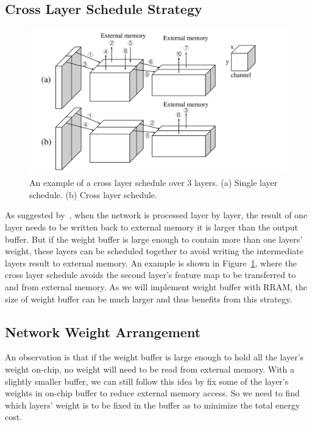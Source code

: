 \subsection{Cross Layer Schedule Strategy}
\begin{figure}[t]
  \centering
  \includegraphics[width=1\columnwidth]{fig/cross_layer.pdf}
  \caption{An example of a cross layer schedule over 3 layers. (a) Single layer schedule. (b) Cross layer schedule.}
  \label{fig:cross_layer}
\end{figure}

As suggested by~\cite{alwani2016fused}, when the network is processed layer by layer, the result of one layer needs to be written back to external memory it is larger than the output buffer. But if the weight buffer is large enough to contain more than one layers' weight, these layers can be scheduled together to avoid writing the intermediate layers result to external memory. An example is shown in Figure~\ref{fig:cross_layer}, where the cross layer schedule avoids the second layer's feature map to be transferred to and from external memory. As we will implement weight buffer with RRAM, the size of weight buffer can be much larger and thus benefits from this strategy.

\subsection{Network Weight Arrangement}
An observation is that if the weight buffer is large enough to hold all the layer's weight on-chip, no weight will need to be read from external memory. With a slightly smaller buffer, we can still follow this idea by fix some of the layer's weights in on-chip buffer to reduce external memory access. So we need to find which layers' weight is to be fixed in the buffer as to minimize the total energy cost.

